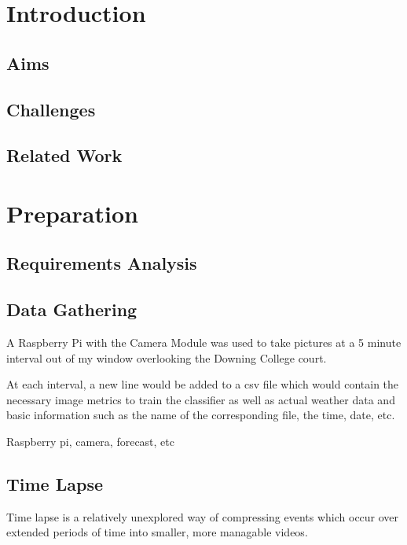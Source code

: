\documentclass[a4paper,12pt,twoside]{report}
\begin{document}
\chapter{Introduction}

\section{Aims}

\section{Challenges}

\section{Related Work} %

\chapter{Preparation}

\section{Requirements Analysis}


\section{Data Gathering}
A Raspberry Pi\cite{x} with the Camera Module\cite{x} was used to take pictures at a 5 minute interval out of my window overlooking the Downing College court.


At each interval, a new line would be added to a csv file which would contain the necessary image metrics to train the classifier as well as actual weather data and basic information such as the name of the corresponding file, the time, date, etc.



Raspberry pi, camera, forecast, etc

\section{Time Lapse}
Time lapse is a relatively unexplored way of compressing events which occur over extended periods of time into smaller, more managable videos. 
\end{document}
